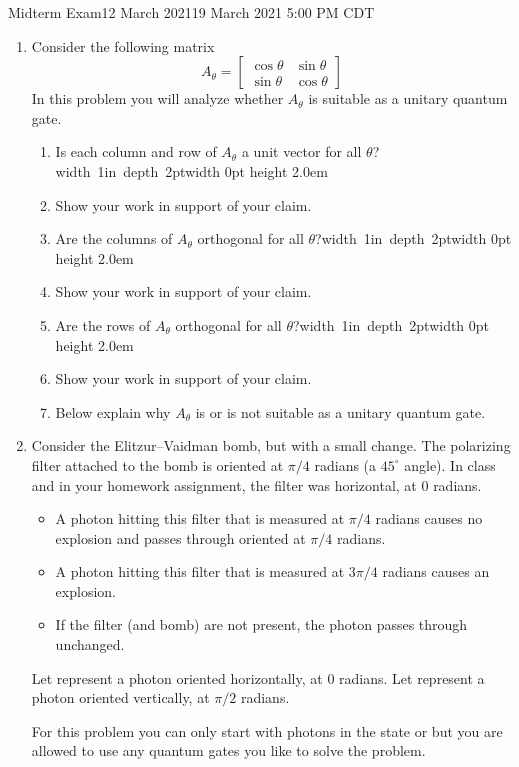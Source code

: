 \documentclass[12pt]{article}
\newcommand{\Blank}{\mbox{\vrule width 1in depth 2pt}\vrule width 0pt height 2.0em}
\begin{document}
\begin{assignment}{Midterm Exam}{12 March 2021}{19 March 2021 5:00 PM CDT}
\begin{enumerate}
\clearpage\item{}
Consider the following matrix
\[
A_{\theta}=
\begin{bmatrix}
\cos{\theta} & \sin{\theta} \\
\sin{\theta} & \cos{\theta}
\end{bmatrix}
\]
In this problem you will analyze whether $A_{\theta}$ is suitable as a unitary quantum
gate.
\begin{enumerate}
 \item{} Is each column and row of $A_\theta$ a unit vector for all
$\theta$?\Blank{}
 \item{} Show your work in support of your claim.
\LeaveSpace{2cm}
 \item{} Are the columns of $A_\theta$ orthogonal for all $\theta$?\Blank{}
 \item{} Show your work in support of your claim.
\LeaveSpace{2cm}
 \item{} Are the rows of $A_\theta$ orthogonal for all $\theta$?\Blank{}
 \item{} Show your work in support of your claim.
\LeaveSpace{2cm}
  \item{} Below explain why $A_\theta$ is or is not suitable as a
unitary quantum gate.
\LeaveSpace{2cm}
\end{enumerate}
\clearpage\item{}
Consider the Elitzur--Vaidman bomb, but with a small change.  The
polarizing filter attached to the bomb is
oriented at $\pi/4$ radians (a $45^{\circ}$ angle).  In class and in your homework assignment,
the filter was horizontal, at $0$ radians.

\begin{itemize}
\item
A photon hitting this filter that is measured at $\pi/4$ radians causes
no explosion and passes through oriented at $\pi/4$ radians.
\item
A photon hitting this filter that is measured at $3\pi/4$ radians causes
an explosion.
\item If the filter (and bomb) are not present, the photon passes through
unchanged.
\end{itemize}
Let  represent a photon oriented horizontally, at $0$ radians.
Let  represent a photon oriented vertically, at $\pi/2$ radians.

For this problem you can only start with photons in the state  or
 but you are allowed to use any quantum gates you like to solve
the problem.


\end{enumerate}
\end{assignment}
\end{document}
